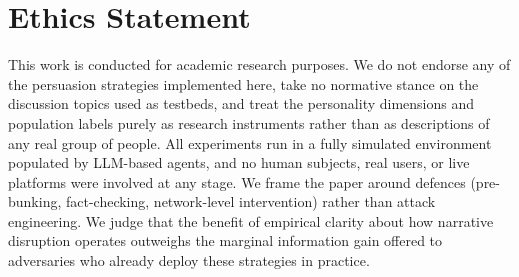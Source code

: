 \section*{Ethics Statement}
\label{sec:ethics}

This work is conducted for academic research purposes. We do not endorse any of the persuasion strategies implemented here, take no normative stance on the discussion topics used as testbeds, and treat the personality dimensions and population labels purely as research instruments rather than as descriptions of any real group of people. All experiments run in a fully simulated environment populated by LLM-based agents, and no human subjects, real users, or live platforms were involved at any stage. We frame the paper around defences (pre-bunking, fact-checking, network-level intervention) rather than attack engineering. We judge that the benefit of empirical clarity about how narrative disruption operates outweighs the marginal information gain offered to adversaries who already deploy these strategies in practice.
